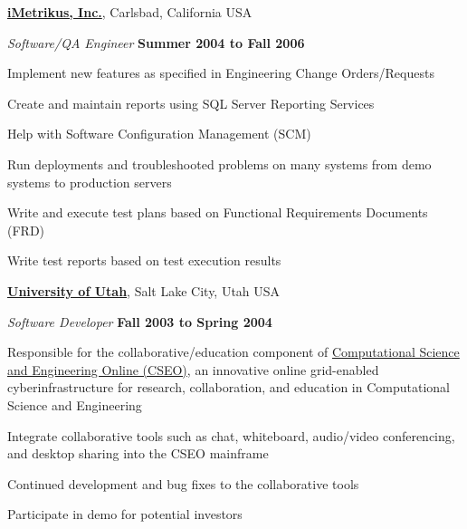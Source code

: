 \documentclass[11pt]{article}
\newenvironment{outerlist}[1][\enskip\textbullet]%
        {\begin{itemize}[#1]}{\end{itemize}%
         \vspace{-.6\baselineskip}}
\newenvironment{innerlist}[1][\enskip\textbullet]%
        {\begin{compactitem}[#1]}{\end{compactitem}}
\newcommand{\blankline}{\quad\pagebreak[2]}
\begin{document}
\blankline

\href{http://www.imetrikus.com/}{\textbf{iMetrikus, Inc.}},
Carlsbad, California USA
\begin{outerlist}

    \item[] \textit{Software/QA Engineer}%
            \hfill \textbf{Summer 2004 to Fall 2006}
    \begin{innerlist}
		\item Implement new features as specified in Engineering Change Orders/Requests
		\item Create and maintain reports using SQL Server Reporting Services
		\item Help with Software Configuration Management (SCM)
		\item Run deployments and troubleshooted problems on many systems from demo systems to production servers
		\item Write and execute test plans based on Functional Requirements Documents (FRD)
		\item Write test reports based on test execution results
    \end{innerlist}

\end{outerlist}

\blankline

\href{http://www.utah.edu/}{\textbf{University of Utah}},
Salt Lake City, Utah USA
\begin{outerlist}

\item[] \textit{Software Developer}%
        \hfill \textbf{Fall 2003 to Spring 2004}
    \begin{innerlist}
		     \item Responsible for the collaborative/education component of \href{http://therate.hec.utah.edu/}{Computational Science and Engineering Online (CSEO)}, an innovative online grid-enabled cyberinfrastructure for research, collaboration, and education in Computational Science and Engineering
		     \item Integrate collaborative tools such as chat, whiteboard, audio/video conferencing, and desktop sharing into the CSEO mainframe
		     \item Continued development and bug fixes to the collaborative tools
		     \item Participate in demo for potential investors
    \end{innerlist}

\end{outerlist}
\end{document}
